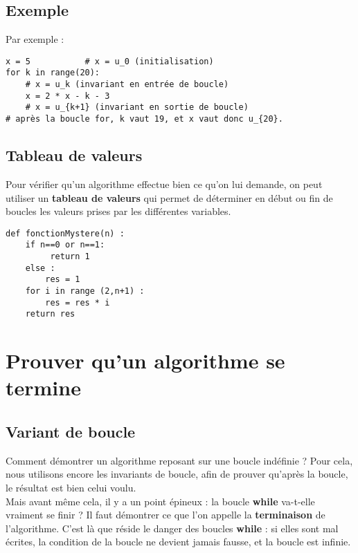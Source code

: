 \subsection{Exemple}

\begin{exemple}
Par exemple :


\begin{lstlisting}
x = 5			# x = u_0 (initialisation)
for k in range(20): 	
    # x = u_k (invariant en entrée de boucle)
    x = 2 * x - k - 3	
    # x = u_{k+1} (invariant en sortie de boucle)	
# après la boucle for, k vaut 19, et x vaut donc u_{20}.
\end{lstlisting}
\end{exemple}

\subsection{Tableau de valeurs}

\begin{defi}
Pour vérifier qu'un algorithme effectue bien ce qu'on lui demande, on peut utiliser un \textbf{tableau de valeurs} qui permet de déterminer en début ou fin de boucles les valeurs prises par les différentes variables.
\end{defi}


\begin{exemple}
\begin{lstlisting}
def fonctionMystere(n) :
    if n==0 or n==1:
         return 1
    else :
        res = 1
    for i in range (2,n+1) :
        res = res * i
    return res
\end{lstlisting}



\end{exemple}


\section{Prouver qu'un algorithme se termine}

\subsection{Variant de boucle}

Comment démontrer un 
algorithme reposant sur une boucle indéfinie ? Pour cela, nous utilisons encore les invariants de 
boucle, afin de prouver qu'après la boucle, le résultat est bien celui voulu.\\
Mais avant même cela, il y a un point épineux : la boucle \textbf{while} va-t-elle vraiment se 
finir ? Il faut démontrer ce que l'on appelle la \textbf{terminaison} de l'algorithme. C'est là que 
réside le danger des boucles \textbf{while} : si elles sont mal écrites, la condition de la boucle 
ne devient jamais fausse, et la boucle est infinie.\\

